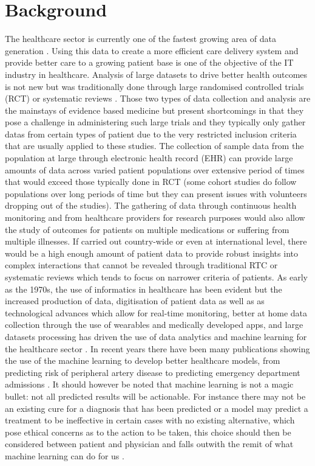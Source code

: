 \section{Background}
The healthcare sector is currently one of the fastest growing area of data generation \cite{EMC:2014ve}. Using this data to create a more efficient care delivery system and provide better care to a growing patient base is one of the objective of the IT industry in healthcare. Analysis of large datasets to drive better health outcomes is not new but was traditionally done through large randomised controlled trials (RCT) or systematic reviews \cite{Callahan:2017bz}. Those two types of data collection and analysis are the mainstays of evidence based medicine but present shortcomings in that they pose a challenge in administering such large trials and they typically only gather datas from certain types of patient due to the very restricted inclusion criteria that are usually applied to these studies.
The collection of sample data from the population at large through electronic health record (EHR) can provide large amounts of data across varied patient populations over extensive period of times that would exceed those typically done in RCT (some cohort studies do follow populations over long periods of time but they can present issues with volunteers dropping out of the studies). The gathering of data through continuous health monitoring and from healthcare providers for research purposes would also allow the study of outcomes for patients on multiple medications or suffering from multiple illnesses. If carried out country-wide or even at international level, there would be a high enough amount of patient data to provide robust insights into complex interactions that cannot be revealed through traditional RTC or systematic reviews which tends to focus on narrower criteria of patients.
As early as the 1970s, the use of informatics in healthcare has been evident but the increased production of data, digitisation of patient data as well as as technological advances which allow for real-time monitoring, better at home data collection through the use of wearables and medically developed apps, and large datasets processing has driven the use of  data analytics and machine learning for the healthcare sector \cite{EMC:2014ve}. 
In recent years there have been many publications showing the use of the machine learning to develop better healthcare models, from predicting risk of peripheral artery disease \cite{Ross:2016kh} to predicting emergency department admissions \cite{Peck:2012eg}.
It should however be noted that machine learning is not a magic bullet: not all predicted results will be actionable. For instance there may not be an existing cure for a diagnosis that has been predicted or a model may predict a treatment to be ineffective in certain cases with no existing alternative, which pose ethical concerns as to the action to be taken, this choice should then be considered between patient and physician and falls outwith the remit of what machine learning can do for us \cite{Callahan:2017bz}.

